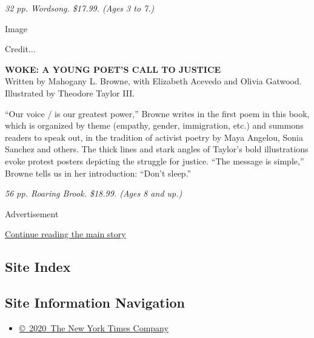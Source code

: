 \emph{32 pp. Wordsong. \$17.99. (Ages 3 to 7.)}

Image

Credit...

\textbf{WOKE: A YOUNG POET'S CALL TO JUSTICE}\\
Written by Mahogany L. Browne, with Elizabeth Acevedo and Olivia
Gatwood.\\
Illustrated by Theodore Taylor III.

``Our voice / is our greatest power,'' Browne writes in the first poem
in this book, which is organized by theme (empathy, gender, immigration,
etc.) and summons readers to speak out, in the tradition of activist
poetry by Maya Angelou, Sonia Sanchez and others. The thick lines and
stark angles of Taylor's bold illustrations evoke protest posters
depicting the struggle for justice. ``The message is simple,'' Browne
tells us in her introduction: ``Don't sleep.''

\emph{56 pp. Roaring Brook. \$18.99. (Ages 8 and up.)}

Advertisement

\protect\hyperlink{after-bottom}{Continue reading the main story}

\hypertarget{site-index}{%
\subsection{Site Index}\label{site-index}}

\hypertarget{site-information-navigation}{%
\subsection{Site Information
Navigation}\label{site-information-navigation}}

\begin{itemize}
\tightlist
\item
  \href{https://help.nytimes3xbfgragh.onion/hc/en-us/articles/115014792127-Copyright-notice}{©~2020~The
  New York Times Company}
\end{itemize}

